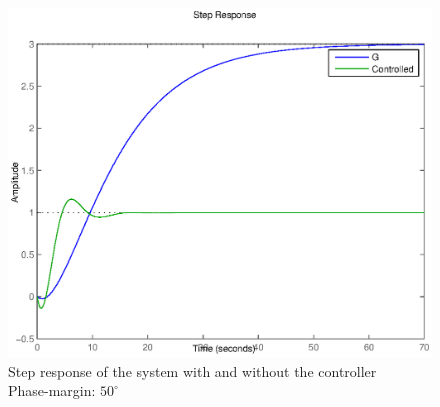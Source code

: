 \begin{figure}[h!b]
   \includegraphics[width=\columnwidth]{fig/step413.eps}
    \caption{Step response of the system with and without the controller \\ Phase-margin: $50^{\circ}$}
    \label{figstep413}
\end{figure}



